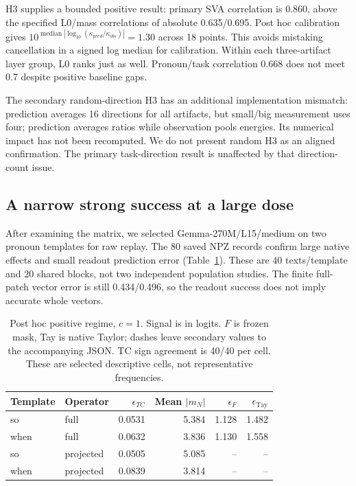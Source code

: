 H3 supplies a bounded positive result: primary SVA correlation is 0.860, above the specified L0/mass correlations of absolute 0.635/0.695. Post hoc calibration gives $10^{\operatorname{median}|\log_{10}(\kappa_{pred}/\kappa_{obs})|}=1.30$ across 18 points. This avoids mistaking cancellation in a signed log median for calibration. Within each three-artifact layer group, L0 ranks just as well. Pronoun/task correlation 0.668 does not meet 0.7 despite positive baseline gaps.

The secondary random-direction H3 has an additional implementation mismatch: prediction averages 16 directions for all artifacts, but small/big measurement uses four; prediction averages ratios while observation pools energies. Its numerical impact has not been recomputed. We do not present random H3 as an aligned confirmation. The primary task-direction result is unaffected by that direction-count issue.

\subsection{A narrow strong success at a large dose}
After examining the matrix, we selected Gemma-270M/L15/medium on two pronoun templates for raw replay. The 80 saved NPZ records confirm large native effects and small readout prediction error (Table~\ref{tab:positive}). These are 40 texts/template and 20 shared blocks, not two independent population studies. The finite full-patch vector error is still 0.434/0.496, so the readout success does not imply accurate whole vectors.

\begin{table}[ht]
\centering\small
\begin{tabular}{llrrrr}
\toprule Template & Operator & $\epsilon_{TC}$ & Mean $|m_N|$ & $\epsilon_{F}$ & $\epsilon_{\mathrm{Tay}}$\\
\midrule
so & full &0.0531&5.384&1.128&1.482\\
when & full &0.0632&3.836&1.130&1.558\\
so & projected &0.0505&5.085&--&--\\
when & projected &0.0839&3.814&--&--\\
\bottomrule
\end{tabular}
\caption{Post hoc positive regime, $c=1$. Signal is in logits. $F$ is frozen mask, Tay is native Taylor; dashes leave secondary values to the accompanying JSON. TC sign agreement is 40/40 per cell. These are selected descriptive cells, not representative frequencies.}\label{tab:positive}
\end{table}

